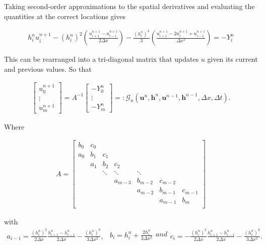 \documentclass[SingleSpace,12pt,Proceedings]{Serre_ASCE}
\begin{document}
Taking second-order approximations to the spatial derivatives and evaluating the quantities at the correct locations gives
\begin{linenomath*}
\begin{gather}
h^{n}_iu^{n+1}_i - \left(h^{n}_i\right)^2 \left(\frac{u^{n+1}_{i+1} -u^{n+1}_{i-1} }{2 \Delta x}\right) - \frac{\left(h^{n}_i\right)^3}{3}\left(\frac{u^{n+1}_{i+1} - 2u^{n+1}_{i} + u^{n+1}_{i-1} }{\Delta x^2}\right) = - Y^n_i 
\label{eq:expandedutdisc3}
\end{gather}
\end{linenomath*}
This can be rearranged into a tri-diagonal matrix that updates $u$ given its current and previous values. So that
\begin{linenomath*}
\begin{gather}
\left[\begin{array}{c}
 u^{n+1}_0 \\
 \vdots \\
 u^{n+1}_m \end{array}\right]
 = A^{-1} \left[\begin{array}{c}
  -Y^n_0 \\
  \vdots \\
  -Y^n_m \end{array}\right] =: \mathcal{G}_u\left(\boldsymbol{u}^n,\boldsymbol{h}^n, \boldsymbol{u}^{n-1},\boldsymbol{h}^{n-1}, \Delta x, \Delta t \right).
\label{eq:FDcentforu}
\end{gather}
\end{linenomath*}
Where
\begin{linenomath*}
\begin{gather*}
A =
\left[\begin{array}{ccccccccc}
 b_0 & c_0 &  & & & &  \\
 a_0 & b_1 & c_1 &  & & & \\
  & a_1 & b_2 & c_2 &  & &   \\
  &  &\ddots &\ddots &\ddots & & \\
  &  &  & a_{m-3} & b_{m-2} & c_{m-2} & \\
  &  &  &  & a_{m-2} & b_{m-1} & c_{m-1} \\
  &  &  & &  & a_{m-1} & b_{m}\\
  \end{array}\right]
\end{gather*}
\end{linenomath*}
with
\begin{subequations}
\begin{gather}
a_{i-1} = \frac{\left(h^n_i\right)^2}{2\Delta x}\frac{h^n_{i+1} - h^n_{i-1}}{2\Delta x} - \frac{\left(h^n_i\right)^3}{3 \Delta x^2}  ,
\label{eq:utriAa}
\end{gather}
\begin{gather}
b_i = h^n_i + \frac{2 h^n_i}{3 \Delta x^2}
\label{eq:utriAb}
\end{gather}
and
\begin{gather}
c_i = -\frac{\left(h^n_i\right)^2}{2\Delta x}\frac{h^n_{i+1} - h^n_{i-1}}{2\Delta x} - \frac{\left(h^n_i\right)^3}{3 \Delta x^2}.
\label{eq:utriAc}
\end{gather}
\end{subequations}
\end{document}
